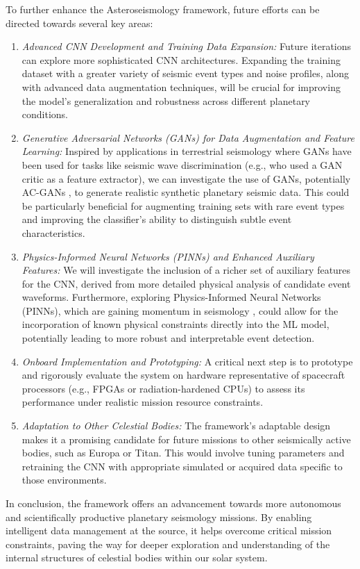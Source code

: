 \documentclass[conference]{IEEEtran}
\begin{document}
To further enhance the Asteroseismology framework, future efforts can be directed towards several key areas:
\begin{enumerate}
\item \textit{Advanced CNN Development and Training Data Expansion:} Future iterations can explore more sophisticated
CNN architectures. Expanding the training dataset with a greater variety of seismic event types and noise profiles,
along with advanced data augmentation techniques, will be crucial for improving the model's generalization and
robustness across different planetary conditions.
\item \textit{Generative Adversarial Networks (GANs) for Data Augmentation and Feature Learning:} Inspired by
applications in terrestrial seismology where GANs have been used for tasks like seismic wave discrimination (e.g.,
\cite{Li2018} who used a GAN critic as a feature extractor), we can investigate the use of GANs, potentially AC-GANs
\cite{Odena2017}, to generate realistic synthetic planetary seismic data. This could be particularly beneficial for
augmenting training sets with rare event types and improving the classifier's ability to distinguish subtle event
characteristics.
\item \textit{Physics-Informed Neural Networks (PINNs) and Enhanced Auxiliary Features:} We will investigate the
inclusion of a richer set of auxiliary features for the CNN, derived from more detailed physical analysis of candidate
event waveforms. Furthermore, exploring Physics-Informed Neural Networks (PINNs), which are gaining momentum in
seismology \cite{Mousavi2022}, could allow for the incorporation of known physical constraints directly into the
ML model, potentially leading to more robust and interpretable event detection.
\item \textit{Onboard Implementation and Prototyping:} A critical next step is to prototype and rigorously evaluate the
system on hardware representative of spacecraft processors (e.g., FPGAs or radiation-hardened CPUs) to
assess its performance under realistic mission resource constraints.
\item \textit{Adaptation to Other Celestial Bodies:} The framework's adaptable design makes it a promising candidate for
future missions to other seismically active bodies, such as Europa or Titan. This would involve tuning parameters and
retraining the CNN with appropriate simulated or acquired data specific to those environments.
\end{enumerate}
In conclusion, the framework offers an advancement towards more autonomous and scientifically productive planetary
seismology missions. By enabling intelligent data management at the source, it helps overcome critical mission
constraints, paving the way for deeper exploration and understanding of the internal structures of celestial bodies
within our solar system.
\end{document}
